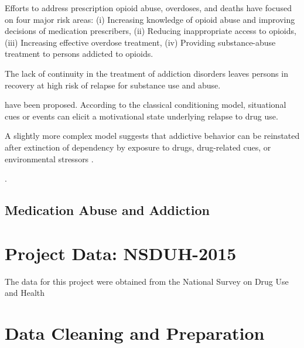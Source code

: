 \documentclass[sigconf]{acmart}
\begin{document}
Efforts to address prescription opioid abuse, overdoses, and deaths have 
focused on four major risk areas: (i) Increasing knowledge of opioid abuse 
and improving decisions of medication prescribers, (ii) Reducing inappropriate 
access to opioids, (iii) Increasing effective overdose treatment, (iv) 
Providing substance-abuse treatment to persons addicted to opioids. 


The lack 
of continuity in the treatment of addiction disorders leaves persons in recovery 
at high risk of relapse for substance use and abuse. 

have been proposed. According to the classical conditioning model, situational 
cues or events can elicit a motivational state underlying relapse to drug use. 

A slightly more complex model suggests that addictive behavior can be reinstated 
after extinction of dependency by exposure to drugs, drug-related cues, or 
environmental stressors \cite{shaham03}. 



\cite{cdc17}.


\cite{johnson11}
\cite{marsch12}
\cite{nida17}


\subsection{Medication Abuse and Addiction} 






\section{Project Data: NSDUH-2015} 

The data for this project were obtained from the National Survey on Drug Use 
and Health 







\section{Data Cleaning and Preparation}\cite{rahm00}




\end{document}
